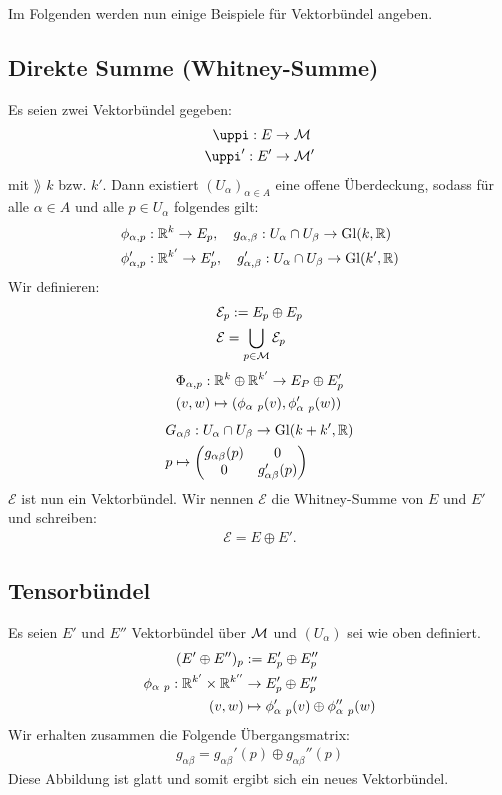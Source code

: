 Im Folgenden werden nun einige Beispiele für Vektorbündel angeben.
\subsection{Direkte Summe (Whitney-Summe)}
Es seien zwei Vektorbündel gegeben:
\begin{align}
\pi : E &\to \mfk \\
\pi ' : E' & \to \mfk '
\end{align}
mit $\rang$ $k$ bzw. $k'$. 
Dann existiert $(U_\alpha)_{\alpha \in A}$ eine offene Überdeckung, sodass für alle $\alpha \in A$ und alle $p \in U_\alpha$ folgendes gilt:
\begin{align}
&\phi_{\alpha, p}: \mathbb{R}^k \to E_p, \quad g_{\alpha, \beta}: U_\alpha \cap U_\beta \to \mathrm{Gl}(k, \mathbb{R})\\
&\phi_{\alpha, p}': \mathbb{R}^{k'} \to E_{p}', \quad g_{\alpha, \beta}': U_\alpha \cap U_\beta \to \mathrm{Gl}(k', \mathbb{R})
\end{align}  
Wir definieren:
\begin{align}
&\mathcal{E}_p := E_p \oplus E_{p}\\
&\mathcal{E} = \bigcup_{p \in \mathcal{M}} \mathcal{E}_p
\end{align}
\begin{align}
&\Phi_{\alpha, p}: \mathbb{R}^k \oplus \mathbb{R}^{k'} \to E_P \oplus E_{p}'\\
&(v, w) \mapsto (\phi_{\alpha \ p} (v), \phi_{\alpha \ p}' (w))
\end{align}
\begin{align}
&G_{\alpha \beta}: U_\alpha \cap U_\beta \to \mathrm{Gl}(k + k', \mathbb{R})\\
&p \mapsto \begin{pmatrix}
g_{\alpha \beta}(p)  & 0 \\ 
0  & g_{\alpha \beta}'(p)
\end{pmatrix} 
\end{align}
$\mathcal{E}$ ist nun ein Vektorbündel. 
Wir nennen $\mathcal{E}$ die Whitney-Summe von $E$ und $E'$ und schreiben:
\begin{align}
\mathcal{E} = E \oplus E'.
\end{align} 

\subsection{Tensorbündel}
Es seien $E'$ und $E''$ Vektorbündel über $\mathcal{M}$ und $(U_\alpha)$ sei wie oben definiert.
\begin{align}
(E' \oplus E'')_p &:= E_{p}'\oplus E_{p}''\\
\phi_{\alpha \ p} : \mathbb{R}^{k'} \times \mathbb{R}^{k''} &\to E_{p}' \oplus E_{p}''\\
(v, w) &\mapsto \phi_{\alpha \ p}'(v) \oplus \phi_{\alpha \ p}'' (w)
\end{align}
Wir erhalten zusammen die Folgende Übergangsmatrix:
\begin{align}
g_{\alpha \beta} = g_{\alpha \beta}'(p) \oplus g_{\alpha \beta}''(p)
\end{align}
Diese Abbildung ist glatt und somit ergibt sich ein neues Vektorbündel.

